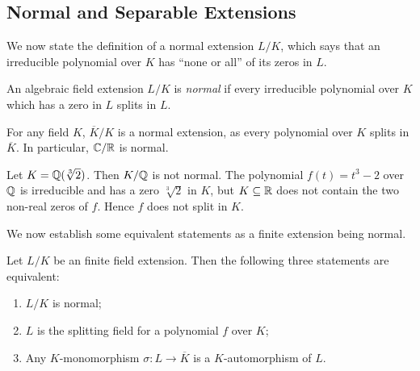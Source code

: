 \subsection{Normal and Separable Extensions}

We now state the definition of a normal extension $L/K$, which says that an irreducible polynomial over $K$ has ``none or all'' of its zeros in $L$. 

\begin{definition}
    An algebraic field extension $L/ K$ is \textit{normal} if every irreducible polynomial over $K$ which has a zero in $L$ splits in $L$. 
\end{definition}

\begin{example}
	For any field $K$, $\overline K / K$ is a normal extension, as every polynomial over $K$ splits in $\overline K$. In particular, $\mathbb C / \mathbb R$ is normal. 
\end{example}


\begin{example}
    Let $K = \mathbb Q(\sqrt[3]{2})$. Then $K / \mathbb Q$ is not normal. The polynomial $f(t) = t^3 - 2$ over $\mathbb Q$ is irreducible and has a zero $\sqrt[3]{2}$ in $K$, but $K \subseteq \mathbb R$ does not contain the two non-real zeros of $f$. Hence $f$ does not split in $K$.
\end{example}

We now establish some equivalent statements as a finite extension being normal.

\begin{theorem} \label{thm:normal-equiv-def}
    Let $L/K$ be an finite field extension. Then the following three statements are equivalent:
    \begin{enumerate}[label=(\roman*)]
        \item $L/K$ is normal;
        \item $L$ is the splitting field for a polynomial $f$ over $K$;
        \item Any $K$-monomorphism $\sigma: L \to \overline K$ is a $K$-automorphism of $L$. 
    \end{enumerate}
\end{theorem}

